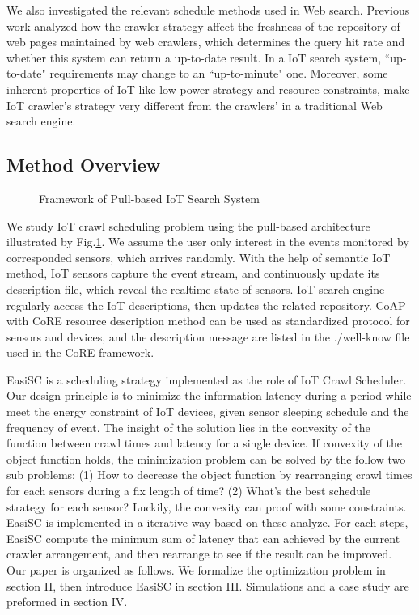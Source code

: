 \documentclass[conference]{IEEEtran}
\begin{document}
We also investigated the relevant schedule methods used in Web search. Previous work\cite{Cho2000}\cite{Wolf2002}\cite{Challenger2004} analyzed how the crawler strategy affect the freshness of the repository of web pages maintained by web crawlers, which determines the query hit rate and whether this system can return a up-to-date result. In a IoT search system, ``up-to-date" requirements may change to an ``up-to-minute" one. Moreover, some inherent properties of IoT like low power strategy and resource constraints, make IoT crawler's strategy very different from the crawlers' in a traditional Web search engine. 

\subsection{Method Overview}
\begin{figure}
	\centering
	
	\captionsetup{justification=centering}
	\caption{Framework of Pull-based IoT Search System}
	\label{fig:framework}
\end{figure}
We study IoT crawl scheduling problem using the pull-based architecture illustrated by Fig.\ref{fig:framework}. 
We assume the user only interest in the events monitored by corresponded sensors, which arrives randomly. With the help of semantic IoT method, IoT sensors capture the event stream, and continuously update its description file, which reveal the realtime state of sensors. IoT search engine regularly access the IoT descriptions, then updates the related repository. CoAP with CoRE resource description method can be used as standardized protocol for sensors and devices, and the description message are listed in the ./well-know file used in the CoRE framework. 


EasiSC is a scheduling strategy implemented as the role of IoT Crawl Scheduler. Our  design principle is to minimize the information latency during  a period while meet the energy constraint of IoT devices, given sensor sleeping schedule and the frequency of event.
The insight of the solution lies in the convexity of the function between crawl times and latency for a single device. If convexity of the object function holds, the minimization problem can be solved by the follow two sub problems: (1) How to decrease the object function by rearranging crawl times for each sensors during a fix length of time? (2) What's the best schedule strategy for each sensor? Luckily, the convexity can proof with some constraints. EasiSC is implemented in a iterative way based on these analyze. For each steps, EasiSC compute the minimum sum of latency that can achieved by the current crawler arrangement, and then rearrange to see if the result can be improved.
Our paper is organized as follows. We formalize the optimization problem in section II, then introduce EasiSC in section III. Simulations and a case study are preformed in section IV. 
\end{document}
